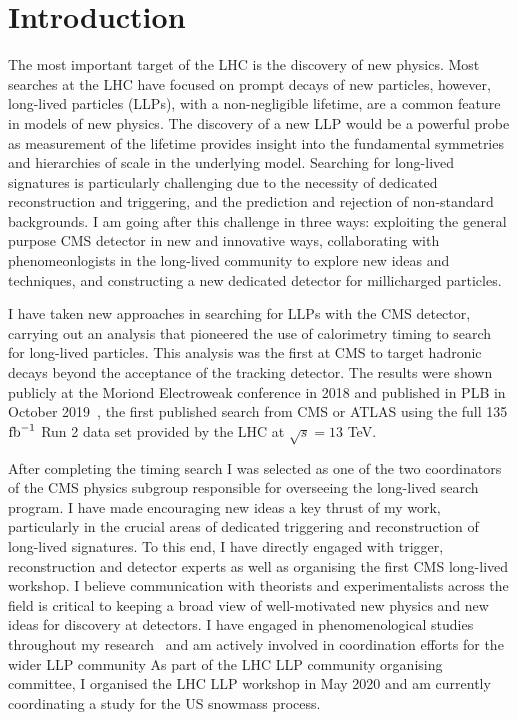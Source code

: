 \documentclass[11pt,twocolumn]{article}
\theoremstyle{plain} \numberwithin{equation}{section}
\theoremstyle{definition}
\DeclareRobustCommand{\ifb}{$\rm{fb}^{-1}~$}
\newcounter{list}
\begin{document}
\section*{Introduction}

The most important target of the LHC is the discovery of new physics.
Most searches at the LHC have focused on prompt decays of new particles,
however, long-lived particles (LLPs), with a non-negligible lifetime,
are a common feature in models of 
new physics. 
The discovery of a new LLP would be a powerful probe as measurement 
of the lifetime provides insight into the fundamental symmetries
and hierarchies of scale in the underlying model.
Searching for long-lived signatures is particularly 
challenging due to the necessity of dedicated reconstruction 
and triggering, and the prediction and rejection of non-standard backgrounds. 
I am going after this challenge in three ways: exploiting
the general purpose CMS detector in new and innovative ways,
collaborating with phenomeonlogists in the long-lived community to 
explore new ideas and techniques, and constructing a new dedicated 
detector for millicharged particles.

I have taken new approaches in searching for LLPs with
the CMS detector, carrying out an analysis
that pioneered the use of calorimetry timing 
to search for long-lived particles.
This analysis was the first at CMS to target hadronic decays 
beyond the acceptance of the tracking 
detector. The results were shown publicly at the Moriond Electroweak 
conference in 2018 and published 
in PLB in October 2019~\cite{2019134876}, 
the first published search from CMS or ATLAS using the 
full 135 \ifb Run 2 data set provided by the LHC at $\sqrt{s} = 13$ TeV. 

After completing the timing search I was selected as one of the two 
coordinators of the CMS physics subgroup responsible for overseeing
the long-lived search program. I have made encouraging 
new ideas a key thrust of my work, particularly in the 
crucial areas of dedicated triggering and reconstruction of long-lived signatures.
To this end, I have directly engaged with
trigger, reconstruction and detector experts as well as organising the 
first CMS long-lived workshop. I believe communication with theorists and experimentalists
across the field is critical to keeping a broad view of well-motivated
new physics and new ideas for discovery at detectors. I have engaged
in phenomenological studies throughout my research~\cite{deVries:2015hva,Citron:2012fg} 
and am actively involved in coordination efforts for the wider LLP community
As part of the LHC LLP community organising committee, I
organised the LHC LLP workshop in May 2020 and am currently
coordinating a study for the US snowmass process.
\end{document}
